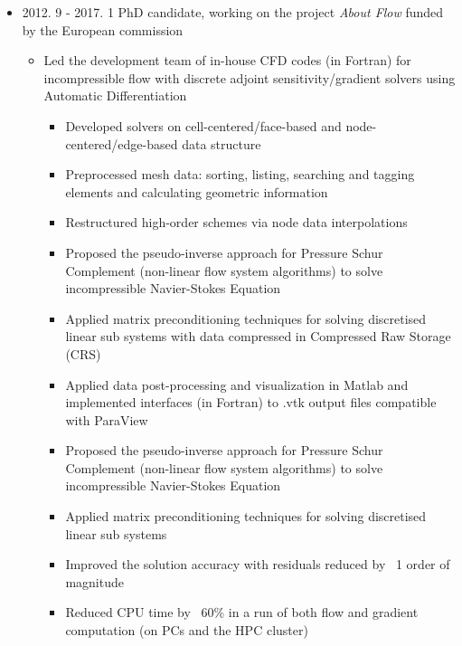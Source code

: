 \documentclass[letterpaper]{article}
\begin{document}
\begin{itemize}
\item 2012. 9 - 2017. 1  \hspace{2pt} PhD candidate, working on the project \textsl{About Flow} funded by the European commission
		\begin{itemize}
		\item Led the development team of in-house CFD codes (in Fortran) for incompressible flow with discrete adjoint sensitivity/gradient solvers using Automatic Differentiation
		\begin{itemize}
		\item Developed solvers on cell-centered/face-based and node-centered/edge-based data structure
		\item Preprocessed mesh data: sorting, listing, searching and tagging elements and calculating geometric information
		\item Restructured high-order schemes via node data interpolations
		\item Proposed the pseudo-inverse approach for Pressure Schur Complement (non-linear flow system algorithms) to solve incompressible Navier-Stokes Equation
		\item Applied matrix preconditioning techniques for solving discretised linear sub systems with data compressed in Compressed Raw Storage (CRS)
%		
		\item Applied data post-processing and visualization in Matlab and implemented interfaces (in Fortran) to .vtk output files compatible with ParaView 
		\item Proposed the pseudo-inverse approach for Pressure Schur Complement (non-linear flow system algorithms) to solve incompressible Navier-Stokes Equation
		\item Applied matrix preconditioning techniques for solving discretised linear sub systems
		\item Improved the solution accuracy with residuals reduced by  ~1 order of magnitude
		\item Reduced CPU time by ~60\% in a run of both flow and gradient computation (on PCs and the HPC cluster)

\end{itemize}
\end{itemize}
\end{itemize}
\end{document}
